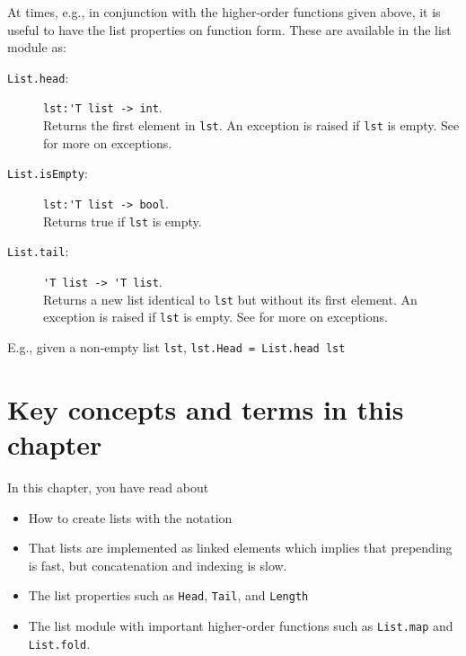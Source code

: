 \documentclass[fsharpNotes.tex]{subfiles}
\begin{document}
At times, e.g., in conjunction with the higher-order functions given above, it is useful to have the list properties on function form. These are available in the list module as:
\begin{description}
\item[\texttt{List.head}:] \lstinline{lst:'T list -> int}.~\\
  Returns the first element in \lstinline{lst}. An exception is raised if \lstinline{lst} is empty. See  for more on exceptions.
\item[\texttt{List.isEmpty}:]  \lstinline{lst:'T list -> bool}.~\\
  Returns true if \lstinline{lst} is empty.
\item[\texttt{List.tail}:]  \lstinline{'T list -> 'T list}.~\\
  Returns a new list identical to \lstinline{lst} but without its first element. An exception is raised if \lstinline{lst} is empty. See  for more on exceptions.
\end{description}
E.g., given a non-empty list \lstinline{lst}, \lstinline{lst.Head = List.head lst}



\section{Key concepts and terms in this chapter}
In this chapter, you have read about
\begin{itemize}
\item How to create lists with the \lexeme{[]} notation
\item That lists are implemented as linked elements which implies that prepending is fast, but concatenation and indexing is slow.
\item The list properties such as \lstinline{Head}, \lstinline{Tail}, and \lstinline{Length}
\item The list module with important higher-order functions such as \lstinline{List.map} and \lstinline{List.fold}.
\end{itemize}
\end{document}
